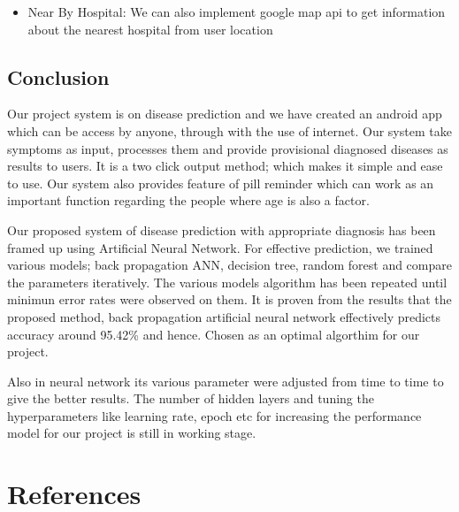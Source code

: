 {\begin{itemize}
   \item Near By Hospital: We can also implement google map api to get information about the nearest hospital from user location
        
\end{itemize}

\section{Conclusion}
 
Our project system is on disease prediction and we have created an android app 
which can be access by anyone, through with the use of internet. Our system take 
symptoms as input, processes them and provide provisional diagnosed diseases as 
results to users. It is a two click output method; which makes it simple and ease to use. 
Our system also provides feature of pill reminder which can work as an important function 
regarding the people where age is also a factor.\par

Our proposed system of disease prediction with appropriate diagnosis has been framed
up using Artificial Neural Network. For effective prediction, we trained various models;
back propagation ANN, decision tree, random forest and compare the parameters iteratively. 
The various models algorithm has been repeated until minimun error rates were observed 
on them. It is proven from the results that the proposed method, back propagation artificial 
neural network effectively predicts accuracy around 95.42\% and hence. Chosen as an optimal algorthim for our project.\par

Also in neural network its various parameter were adjusted from time to time to give 
the better results. The number of hidden layers and tuning the hyperparameters like
learning rate, epoch etc for increasing the performance model for our project is still in 
working stage.





\chapter*{References}

}

